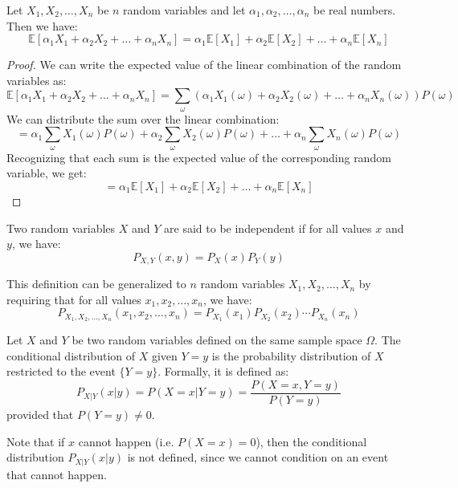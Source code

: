 \begin{theorem}
    Let $X_1, X_2, \dots, X_n$ be $n$ random variables and let $\alpha_1, \alpha_2, \dots, \alpha_n$ be real numbers. Then we have:
    \[
        \mathbb{E}[\alpha_1 X_1 + \alpha_2 X_2 + \dots + \alpha_n X_n] = \alpha_1 \mathbb{E}[X_1] + \alpha_2 \mathbb{E}[X_2] + \dots + \alpha_n \mathbb{E}[X_n]
    \]
\end{theorem}
\begin{proof}
    We can write the expected value of the linear combination of the random variables as:
    \[
        \mathbb{E}[\alpha_1 X_1 + \alpha_2 X_2 + \dots + \alpha_n X_n] = \sum_{\omega} (\alpha_1 X_1(\omega) + \alpha_2 X_2(\omega) + \dots + \alpha_n X_n(\omega)) P(\omega)
    \]
    We can distribute the sum over the linear combination:
    \[
        = \alpha_1 \sum_{\omega} X_1(\omega) P(\omega) + \alpha_2 \sum_{\omega} X_2(\omega) P(\omega) + \dots + \alpha_n \sum_{\omega} X_n(\omega) P(\omega)
    \]
    Recognizing that each sum is the expected value of the corresponding random variable, we get:
    \[
        = \alpha_1 \mathbb{E}[X_1] + \alpha_2 \mathbb{E}[X_2] + \dots + \alpha_n \mathbb{E}[X_n]
    \]
\end{proof}

\begin{definition}
    Two random variables $X$ and $Y$ are said to be independent if for all values $x$ and $y$, we have:
    \[
        P_{X,Y}(x,y) = P_X(x)P_Y(y)
    \]
\end{definition}
This definition can be generalized to $n$ random variables $X_1, X_2, \dots, X_n$ by requiring that for all values $x_1, x_2, \dots, x_n$, we have:
\[
    P_{X_1, X_2, \dots, X_n}(x_1, x_2, \dots, x_n) = P_{X_1}(x_1)P_{X_2}(x_2) \cdots P_{X_n}(x_n)
\]

\begin{definition}
    Let $X$ and $Y$ be two random variables defined on the same sample space $\Omega$. The conditional distribution of $X$ given $Y = y$ is the probability distribution of $X$ restricted to the event $\{Y = y\}$. Formally, it is defined as:
    \[
        P_{X|Y}(x|y) = P(X = x | Y = y) = \frac{P(X = x, Y = y)}{P(Y = y)}
    \]
    provided that $P(Y = y) \neq 0$.
\end{definition}
Note that if $x$ cannot happen (i.e. $P(X = x) = 0$), then the conditional distribution $P_{X|Y}(x|y)$ is not defined, since we cannot condition on an event that cannot happen.

